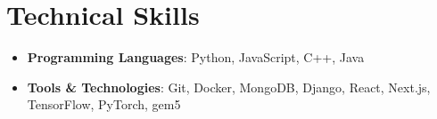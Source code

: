 \documentclass[letterpaper,10pt]{article}
\newcommand{\resumeItem}[1]{\item\small{#1}}
\newcommand{\resumeSubHeadingList}{\begin{itemize}[leftmargin=0.15in, label={}]}
\newcommand{\resumeSubHeadingListEnd}{\end{itemize}}
\begin{document}
\section{Technical Skills}
\resumeSubHeadingList
  \resumeItem{\textbf{Programming Languages}: Python, JavaScript, C++, Java}
    \resumeItem{\textbf{Tools \& Technologies}: Git, Docker, MongoDB, Django, React, Next.js, TensorFlow, PyTorch, gem5}
\resumeSubHeadingListEnd
\end{document}
